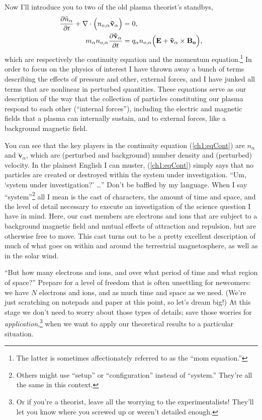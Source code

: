 Now I'll introduce you to two of the old plasma theorist's standbys,
\begin{subequations}
  \begin{align} 
    \dfrac{\partial \tilde n_{\alpha}}{\partial t} + {\bf \nabla} \cdot \Big (n_{o,\alpha} \mathbf{\tilde v}_{\alpha} \Big ) &= 0, \label{ch1:eqCont} \\
    m_{\alpha} n_{o,\alpha} \dfrac{\partial \mathbf{\tilde v}_{\alpha}}{\partial t} &=
    q_{\alpha} n_{o,\alpha} \Big ( \mathbf{E} + \mathbf{\tilde v}_{\alpha}
    \times \mathbf{B_o} \Big ), \label{ch1:eqMom}
  \end{align}
\end{subequations}
which are respectively the continuity equation and the momentum
equation.\footnote{The latter is sometimes affectionately referred to as the
  ``mom equation.''} In order to focus on the physics of interest I have thrown
away a bunch of terms describing the effects of pressure and other, external
forces, and I have junked all terms that are nonlinear in perturbed
quantities. These equations serve as our description of the way that the
collection of particles constituting our plasma respond to each other
(``internal forces''), including the electric and magnetic fields that a plasma
can internally sustain, and to external forces, like a background magnetic
field.

You can see that the key players in the continuity equation (\ref{ch1:eqCont})
are $n_{\alpha}$ and $\mathbf{\tilde v}_{\alpha}$, which are (perturbed and
background) number density and (perturbed) velocity. In the plainest English I
can muster, (\ref{ch1:eqCont}) simply says that no particles are created or
destroyed within the system under investigation. ``Um, `system under
investigation?' \dots'' Don't be baffled by my language. When I say
``system''\footnote{Others might use ``setup'' or ``configuration'' instead of
  ``system.'' They're all the same in this context.} all I mean is the cast of
characters, the amount of time and space, and the level of detail necessary to
execute an investigation of the science question I have in mind. Here, our cast
members are electrons and ions that are subject to a background magnetic field
and mutual effects of attraction and repulsion, but are otherwise free to
move. This cast turns out to be a pretty excellent description of much of what
goes on within and around the terrestrial magnetosphere, as well as in the solar
wind.

``But how many electrons and ions, and over what period of time and what region
of space?'' Prepare for a level of freedom that is often unsettling for
newcomers: we have $N$ electrons and ions, and as much time and space as we
need. (We're just scratching on notepads and paper at this point, so let's dream
big!) At this stage we don't need to worry about those types of details; save
those worries for \emph{application},\footnote{Or if you're a theorist, leave
  all the worrying to the experimentalists! They'll let you know where you
  screwed up or weren't detailed enough.} when we want to apply our theoretical
results to a particular situation.

